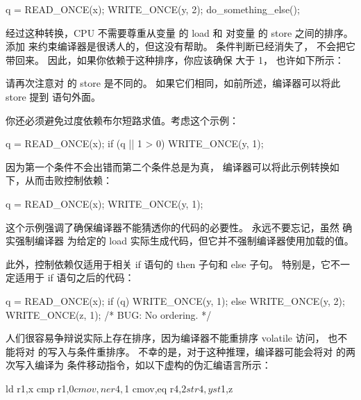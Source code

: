 \begin{VerbatimN}
q = READ_ONCE(x);
WRITE_ONCE(y, 2);
do_something_else();
\end{VerbatimN}

经过这种转换，CPU 不需要尊重从变量  的 load 和
对变量  的 store 之间的排序。
添加  来约束编译器是很诱人的，但这没有帮助。
条件判断已经消失了， 不会把它带回来。
因此，如果你依赖于这种排序，你应该确保  大于 1，
也许如下所示：


请再次注意对  的 store 是不同的。
如果它们相同，如前所述，编译器可以将此 store 提到  语句外面。

你还必须避免过度依赖布尔短路求值。考虑这个示例：

\begin{VerbatimN}
q = READ_ONCE(x);
if (q || 1 > 0)
	WRITE_ONCE(y, 1);
\end{VerbatimN}

因为第一个条件不会出错而第二个条件总是为真，
编译器可以将此示例转换如下，从而击败控制依赖：

\begin{VerbatimN}
q = READ_ONCE(x);
WRITE_ONCE(y, 1);
\end{VerbatimN}

这个示例强调了确保编译器不能猜透你的代码的必要性。
永远不要忘记，虽然  确实强制编译器
为给定的 load 实际生成代码，但它并不强制编译器使用加载的值。

此外，控制依赖仅适用于相关 if 语句的 then 子句和 else 子句。
特别是，它不一定适用于 if 语句之后的代码：

\begin{VerbatimN}
q = READ_ONCE(x);
if (q)
	WRITE_ONCE(y, 1);
else
	WRITE_ONCE(y, 2);
WRITE_ONCE(z, 1);  /* BUG: No ordering. */
\end{VerbatimN}

人们很容易争辩说实际上存在排序，因为编译器不能重排序 volatile 访问，
也不能将对  的写入与条件重排序。
不幸的是，对于这种推理，编译器可能会将对  的两次写入编译为
条件移动指令，如以下虚构的伪汇编语言所示：

\begin{VerbatimN}
ld r1,x
cmp r1,$0
cmov,ne r4,$1
cmov,eq r4,$2
st r4,y
st $1,z
\end{VerbatimN}

